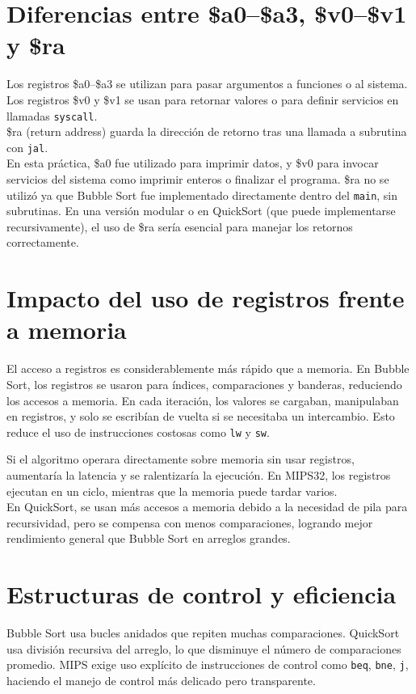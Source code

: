 \documentclass[12pt]{article}
\begin{document}
\section{Diferencias entre \$a0--\$a3, \$v0--\$v1 y \$ra}
Los registros \$a0--\$a3 se utilizan para pasar argumentos a funciones o al sistema.\\
Los registros \$v0 y \$v1 se usan para retornar valores o para definir servicios en llamadas \texttt{syscall}.\\
\$ra (return address) guarda la dirección de retorno tras una llamada a subrutina con \texttt{jal}.\\
En esta práctica, \$a0 fue utilizado para imprimir datos, y \$v0 para invocar servicios del sistema como imprimir enteros o finalizar el programa. \$ra no se utilizó ya que Bubble Sort fue implementado directamente dentro del \texttt{main}, sin subrutinas. En una versión modular o en QuickSort (que puede implementarse recursivamente), el uso de \$ra sería esencial para manejar los retornos correctamente.

\section{Impacto del uso de registros frente a memoria}
El acceso a registros es considerablemente más rápido que a memoria. En Bubble Sort, los registros se usaron para índices, comparaciones y banderas, reduciendo los accesos a memoria. En cada iteración, los valores se cargaban, manipulaban en registros, y solo se escribían de vuelta si se necesitaba un intercambio. Esto reduce el uso de instrucciones costosas como \texttt{lw} y \texttt{sw}.

Si el algoritmo operara directamente sobre memoria sin usar registros, aumentaría la latencia y se ralentizaría la ejecución. En MIPS32, los registros ejecutan en un ciclo, mientras que la memoria puede tardar varios.\\
En QuickSort, se usan más accesos a memoria debido a la necesidad de pila para recursividad, pero se compensa con menos comparaciones, logrando mejor rendimiento general que Bubble Sort en arreglos grandes.

\section{Estructuras de control y eficiencia}
Bubble Sort usa bucles anidados que repiten muchas comparaciones. QuickSort usa división recursiva del arreglo, lo que disminuye el número de comparaciones promedio. MIPS exige uso explícito de instrucciones de control como \texttt{beq}, \texttt{bne}, \texttt{j}, haciendo el manejo de control más delicado pero transparente.
\end{document}
